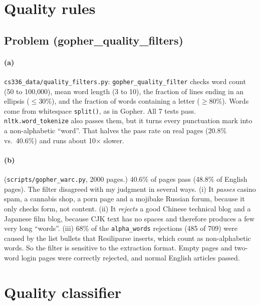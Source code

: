 \documentclass[11pt]{article}
\begin{document}
\section{Quality rules}

\subsection*{Problem (gopher\_quality\_filters)}

\paragraph{(a)} \texttt{cs336\_data/quality\_filters.py}: \texttt{gopher\_quality\_filter} checks
word count (50 to 100{,}000), mean word length (3 to 10), the fraction of lines ending in an
ellipsis ($\leq 30\%$), and the fraction of words containing a letter ($\geq 80\%$). Words come from
whitespace \texttt{split()}, as in Gopher. All 7 tests pass. \texttt{nltk.word\_tokenize} also
passes them, but it turns every punctuation mark into a non-alphabetic ``word''. That halves the
pass rate on real pages (20.8\% vs.\ 40.6\%) and runs about 10$\times$ slower.

\paragraph{(b)} (\texttt{scripts/gopher\_warc.py}, 2000 pages.) 40.6\% of pages pass (48.8\%
of English pages). The filter disagreed with my judgment in several ways.
(i) It \emph{passes} casino spam, a cannabis shop, a porn page and a mojibake Russian forum,
because it only checks form, not content.
(ii) It \emph{rejects} a good Chinese technical blog and a Japanese film blog, because CJK text
has no spaces and therefore produces a few very long ``words''.
(iii) 68\% of the \texttt{alpha\_words} rejections (485 of 709) were caused by the
\texttt{\textbullet} list bullets that Resiliparse inserts, which count as non-alphabetic
words. So the filter is sensitive to the extraction format. Empty pages and two-word login
pages were correctly rejected, and normal English articles passed.

\section{Quality classifier}
\end{document}
